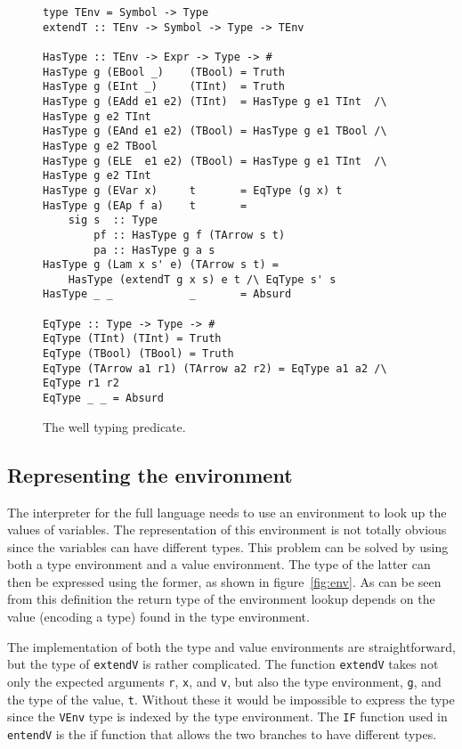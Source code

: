 \documentclass{llncs}[12pt]             %
\newcommand{\te}[1]{{\tt #1}}
\begin{document}
\begin{figure}
\begin{verbatim}
type TEnv = Symbol -> Type
extendT :: TEnv -> Symbol -> Type -> TEnv

HasType :: TEnv -> Expr -> Type -> #
HasType g (EBool _)    (TBool) = Truth
HasType g (EInt _)     (TInt)  = Truth
HasType g (EAdd e1 e2) (TInt)  = HasType g e1 TInt  /\ HasType g e2 TInt
HasType g (EAnd e1 e2) (TBool) = HasType g e1 TBool /\ HasType g e2 TBool
HasType g (ELE  e1 e2) (TBool) = HasType g e1 TInt  /\ HasType g e2 TInt
HasType g (EVar x)     t       = EqType (g x) t
HasType g (EAp f a)    t       = 
    sig s  :: Type
        pf :: HasType g f (TArrow s t)
        pa :: HasType g a s
HasType g (Lam x s' e) (TArrow s t) = 
    HasType (extendT g x s) e t /\ EqType s' s
HasType _ _            _       = Absurd

EqType :: Type -> Type -> #
EqType (TInt) (TInt) = Truth
EqType (TBool) (TBool) = Truth
EqType (TArrow a1 r1) (TArrow a2 r2) = EqType a1 a2 /\ EqType r1 r2
EqType _ _ = Absurd
\end{verbatim}
\caption{The well typing predicate.}
\label{fig:hastype}
\end{figure}

\subsection{Representing the environment}
The interpreter for the full language needs to use an environment to
look up the values of variables.  The representation of this environment
is not totally obvious since the variables can have different types.
This problem can be solved by using both a type environment and a
value environment.  The type of the latter can then be expressed
using the former, as shown in figure~\ref{fig:env}.
As can be seen from this definition the return type of the
environment lookup depends on the value (encoding a type)
found in the type environment.

The implementation of both the type and value environments are 
straightforward, but the type of \te{extendV} is rather complicated.
The function \te{extendV} takes not only the expected arguments \te{r}, \te{x}, and \te{v},
but also the type environment, \te{g}, and the type of the value, \te{t}.
Without these it would be impossible to express the type since
the \te{VEnv} type is indexed by the type environment.
The \te{IF} function used in \te{entendV} is the if function that
allows the two branches to have different types.
\end{document}
